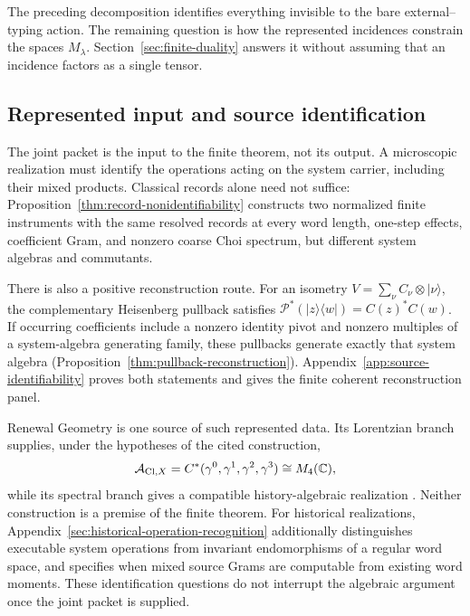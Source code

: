 \documentclass[11pt]{article}
\numberwithin{equation}{section}
\theoremstyle{definition}
\theoremstyle{remark}
\newcommand{\C}{\mathbb C}
\newcommand{\A}{\mathcal A}
\begin{document}
The preceding decomposition identifies everything invisible to the bare
external--typing action.  The remaining question is how the represented
incidences constrain the spaces $M_\lambda$.  Section~\ref{sec:finite-duality}
answers it without assuming that an incidence factors as a single tensor.


\subsection{Represented input and source identification}
\label{sec:operational-identification}

The joint packet is the input to the finite theorem, not its output.  A
microscopic realization must identify the operations acting on the system
carrier, including their mixed products.  Classical records alone need not
suffice: Proposition~\ref{thm:record-nonidentifiability} constructs two
normalized finite instruments with the same resolved records at every word
length, one-step effects, coefficient Gram, and nonzero coarse Choi spectrum,
but different system algebras and commutants.

There is also a positive reconstruction route.  For an isometry
$V=\sum_\nu C_\nu\otimes|\nu\rangle$, the complementary Heisenberg pullback
satisfies $\mathcal P^*(|z\rangle\langle w|)=C(z)^*C(w)$.  If occurring
coefficients include a nonzero identity pivot and nonzero multiples of a
system-algebra generating family, these pullbacks generate exactly that
system algebra (Proposition~\ref{thm:pullback-reconstruction}).
Appendix~\ref{app:source-identifiability} proves both statements and gives the
finite coherent reconstruction panel.

Renewal Geometry is one source of such represented data.  Its Lorentzian
branch supplies, under the hypotheses of the cited construction,
\begin{equation}
 \A_{{\rm Cl},X}=C^*(\gamma^0,\gamma^1,\gamma^2,\gamma^3)\cong M_4(\C),
 \label{eq:external-clifford}
\end{equation}
while its spectral branch gives a compatible history-algebraic realization
\cite{PelissierSpacetime2026,PelissierSpectral2026}.  Neither construction is a
premise of the finite theorem.  For historical realizations,
Appendix~\ref{sec:historical-operation-recognition} additionally distinguishes
executable system operations from invariant endomorphisms of a regular word
space, and specifies when mixed source Grams are computable from existing
word moments.  These identification questions do not interrupt the algebraic
argument once the joint packet is supplied.
\end{document}
